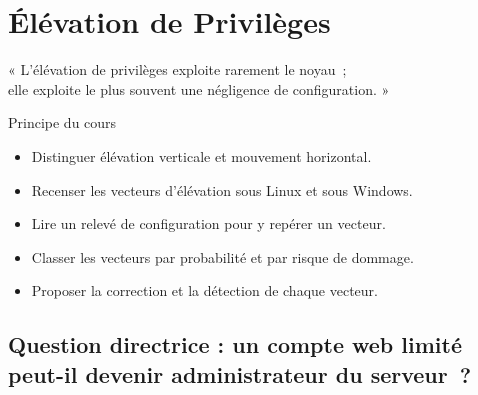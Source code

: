 
\chapter{Élévation de Privilèges}
\label{chap:privileges}

\epigraph{%
    « L'élévation de privilèges exploite rarement le noyau~;\\
    elle exploite le plus souvent une négligence de configuration. »%
}{Principe du cours}


\begin{boxobjectifs}
\begin{itemize}
    \item Distinguer élévation verticale et mouvement horizontal.
    \item Recenser les vecteurs d'élévation sous Linux et sous Windows.
    \item Lire un relevé de configuration pour y repérer un vecteur.
    \item Classer les vecteurs par probabilité et par risque de dommage.
    \item Proposer la correction et la détection de chaque vecteur.
\end{itemize}
\end{boxobjectifs}

\bigskip

\section*{Question directrice : un compte web limité peut-il devenir administrateur du serveur~?}


